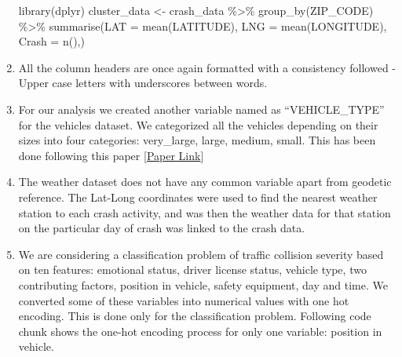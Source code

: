 \documentclass[
]{article}
\newenvironment{Shaded}{\begin{snugshade}}{\end{snugshade}}
\newcommand{\AttributeTok}[1]{\textcolor[rgb]{0.77,0.63,0.00}{#1}}
\newcommand{\FunctionTok}[1]{\textcolor[rgb]{0.00,0.00,0.00}{#1}}
\newcommand{\NormalTok}[1]{#1}
\newcommand{\OtherTok}[1]{\textcolor[rgb]{0.56,0.35,0.01}{#1}}
\newcommand{\SpecialCharTok}[1]{\textcolor[rgb]{0.00,0.00,0.00}{#1}}
\begin{document}
\begin{enumerate}
\begin{Shaded}
\begin{Highlighting}[]
\FunctionTok{library}\NormalTok{(dplyr)}
\NormalTok{cluster\_data }\OtherTok{\textless{}{-}}\NormalTok{ crash\_data }\SpecialCharTok{\%\textgreater{}\%} \FunctionTok{group\_by}\NormalTok{(ZIP\_CODE) }\SpecialCharTok{\%\textgreater{}\%} \FunctionTok{summarise}\NormalTok{(}\AttributeTok{LAT =} \FunctionTok{mean}\NormalTok{(LATITUDE),}
                                                              \AttributeTok{LNG =} \FunctionTok{mean}\NormalTok{(LONGITUDE),}
                                                              \AttributeTok{Crash =} \FunctionTok{n}\NormalTok{(),)}
\end{Highlighting}
\end{Shaded}
\item
  All the column headers are once again formatted with a consistency
  followed - Upper case letters with underscores between words.
\item
  For our analysis we created another variable named as
  ``VEHICLE\_TYPE'' for the vehicles dataset. We categorized all the
  vehicles depending on their sizes into four categories: very\_large,
  large, medium, small. This has been done following this paper
  {[}\href{https://www.researchgate.net/publication/337243001_Applying_Big_Data_Analytics_on_Motor_Vehicle_Collision_Predictions_in_New_York_City}{Paper
  Link}{]}
\item
  The weather dataset does not have any common variable apart from
  geodetic reference. The Lat-Long coordinates were used to find the
  nearest weather station to each crash activity, and was then the
  weather data for that station on the particular day of crash was
  linked to the crash data.
\item
  We are considering a classification problem of traffic collision
  severity based on ten features: emotional status, driver license
  status, vehicle type, two contributing factors, position in vehicle,
  safety equipment, day and time. We converted some of these variables
  into numerical values with one hot encoding. This is done only for the
  classification problem. Following code chunk shows the one-hot
  encoding process for only one variable: position in vehicle.


\end{enumerate}
\end{document}
